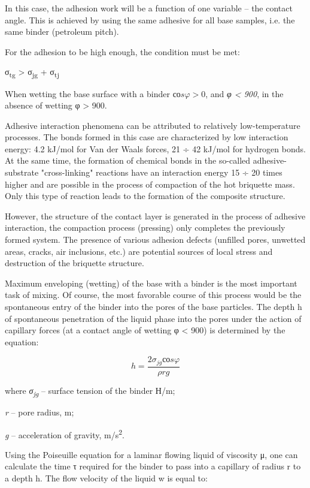 In this case, the adhesion work will be a function of one variable --
the contact angle. This is achieved by using the same adhesive for all
base samples, i.e. the same binder (petroleum pitch).

For the adhesion to be high enough, the condition must be met:

σ\textsubscript{tg} \textgreater{} σ\textsubscript{jg} +
σ\textsubscript{tj}

When wetting the base surface with a binder \(соs\varphi > 0\), and
\emph{φ \textless{} 900}, in the absence of wetting φ \textgreater{}
900.

Adhesive interaction phenomena can be attributed to relatively
low-temperature processes. The bonds formed in this case are
characterized by low interaction energy: 4.2 kJ/mol for Van der Waals
forces, 21 ÷ 42 kJ/mol for hydrogen bonds. At the same time, the
formation of chemical bonds in the so-called adhesive-substrate
"cross-linking" reactions have an interaction energy 15 ÷ 20 times
higher and are possible in the process of compaction of the hot
briquette mass. Only this type of reaction leads to the formation of the
composite structure.

However, the structure of the contact layer is generated in the process
of adhesive interaction, the compaction process (pressing) only
completes the previously formed system. The presence of various adhesion
defects (unfilled pores, unwetted areas, cracks, air inclusions, etc.)
are potential sources of local stress and destruction of the briquette
structure.

Maximum enveloping (wetting) of the base with a binder is the most
important task of mixing. Of course, the most favorable course of this
process would be the spontaneous entry of the binder into the pores of
the base particles. The depth h of spontaneous penetration of the liquid
phase into the pores under the action of capillary forces (at a contact
angle of wetting φ \textless{} 900) is determined by the equation:

\[h = \frac{2\sigma_{jg}соs\varphi}{\rho rg}\]

where \emph{σ\textsubscript{jg}} -- surface tension of the binder Н/m;

\emph{r} -- pore radius, m;

\emph{g} -- acceleration of gravity, m/s\textsuperscript{2}.

Using the Poiseuille equation for a laminar flowing liquid of viscosity
μ, one can calculate the time τ required for the binder to pass into a
capillary of radius r to a depth h. The flow velocity of the liquid w is
equal to:


